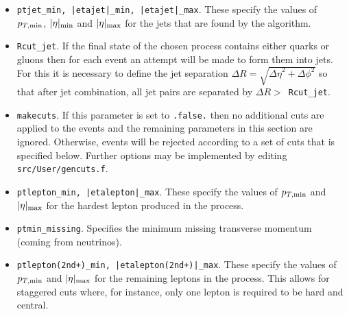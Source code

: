 \documentclass[12pt]{article}
\begin{document}
\begin{itemize}
\item {\tt ptjet\_min, |etajet|\_min, |etajet|\_max}. These specify the values
of $p_{T,{\rm min}}$, $|\eta|_{\rm min}$ and $|\eta|_{\rm max}$ for the
jets that are found by the algorithm. 

\item {\tt Rcut\_jet}. If the final state of the chosen process contains
either quarks or gluons then for each event an attempt will be made
to form them into jets. For this it is necessary to define the
jet separation $\Delta R=\sqrt{{\Delta \eta}^2 + {\Delta \phi}^2}$
so that after jet combination, all jet pairs are separated by
$\Delta R >$~{\tt Rcut\_jet}.

\item {\tt makecuts}. If this parameter is set to {\tt .false.} then
no additional cuts are applied to the events and the remaining
parameters in this section are ignored. Otherwise, events will
be rejected according to a set of cuts that is specified below.
Further options may be implemented by editing {\tt src/User/gencuts.f}.

\item {\tt ptlepton\_min, |etalepton|\_max}. These specify the values
of $p_{T,{\rm min}}$ and $|\eta|_{\rm max}$ for the hardest lepton produced
in the process.

\item {\tt ptmin\_missing}. Specifies the minimum missing transverse
momentum (coming from neutrinos).

\item {\tt ptlepton(2nd+)\_min, |etalepton(2nd+)|\_max}. These specify
the values of $p_{T,{\rm min}}$ and $|\eta|_{\rm max}$ for the remaining
leptons in the process. This allows for staggered cuts where, for
instance, only one lepton is required to be hard and central.


\end{itemize}
\end{document}
